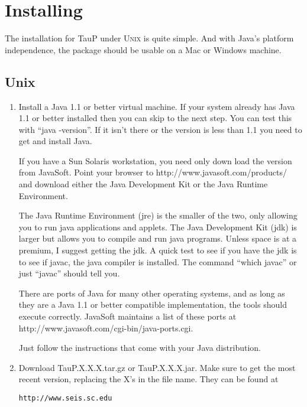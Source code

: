 
\section{Installing}
\label{install}

The installation for TauP under \textsc{Unix} is quite simple. And with Java's 
platform independence, the package should be usable on a Mac or Windows
machine.

\subsection{Unix}

\begin{enumerate}
\item Install a Java 1.1 or better virtual machine. If your system already has Java 1.1
or better installed then you can skip to the next step. You can test this
with ``java -version''. If it isn't there or the version is less than 1.1
you need to get and install Java.

If you have a Sun Solaris
workstation, you need only down load the version from JavaSoft. Point
your browser to http://www.javasoft.com/products/ and download either
the Java Development Kit or the Java Runtime Environment.

The Java Runtime Environment (jre)
is the smaller of the two, only allowing you to run java applications and applets.
The Java Development Kit (jdk) is larger but allows you
to compile and run java programs. 
Unless space is at a
premium, I suggest getting the jdk. A quick test to see if you have
the jdk is to see if javac, the java compiler is installed. The command
``which javac'' or just ``javac'' should tell you. 

There are ports of Java for many other operating systems, and as long as
they are a Java 1.1 or better compatible implementation, the tools 
should execute correctly.
JavaSoft maintains a list of these ports at\newline
http://www.javasoft.com/cgi-bin/java-ports.cgi.

Just follow the instructions that come with your Java distribution.

\item Download TauP.X.X.X.tar.gz or TauP.X.X.X.jar. Make sure to get the most recent version, replacing the X's  in the file name. They can be found at

\texttt{http://www.seis.sc.edu}


\end{enumerate}
